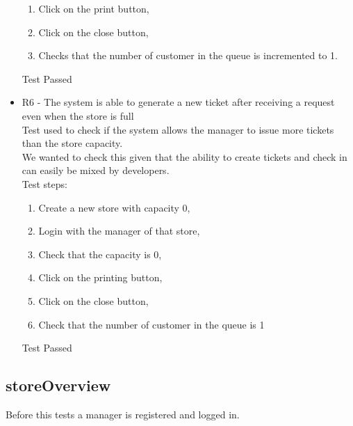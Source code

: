 \begin{itemize}
\begin{enumerate}
        \item Click on the print button,

        \item Click on the close button,

        \item Checks that the number of customer in the queue is incremented to 1.
    \end{enumerate}
    Test Passed

    \item R6 - The system is able to generate a new ticket after receiving a request even when the store is full \\
    Test used to check if the system allows the manager to issue more tickets than the store capacity. \\
    We wanted to check this given that the ability to create tickets and check in can easily be mixed by developers. \\
    Test steps: \\
    \begin{enumerate}
        \item Create a new store with capacity 0,
        \item Login with the manager of that store,
        \item Check that the capacity is 0,
        \item Click on the printing button,
        \item Click on the close button,
        \item Check that the number of customer in the queue is 1
    \end{enumerate}
    Test Passed\\
\end{itemize}

\subsection{storeOverview}

Before this tests a manager is registered and logged in.

